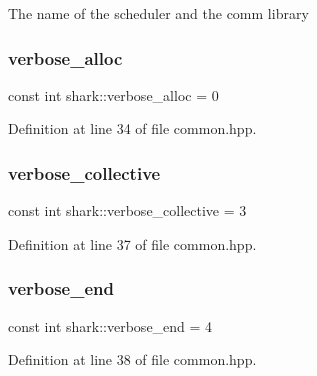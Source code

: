 The name of the scheduler and the comm library \hypertarget{namespaceshark_a067e8941bdd5f38f5ab2e49920787b9d}{}\label{namespaceshark_a067e8941bdd5f38f5ab2e49920787b9d} 
\subsubsection{\texorpdfstring{verbose\+\_\+alloc}{verbose\_alloc}}
{\footnotesize\ttfamily const int shark\+::verbose\+\_\+alloc = 0\hspace{0.3cm}{\ttfamily [static]}}



Definition at line 34 of file common.\+hpp.

\hypertarget{namespaceshark_a8a29362250362c792179fc4096ae03a6}{}\label{namespaceshark_a8a29362250362c792179fc4096ae03a6} 
\subsubsection{\texorpdfstring{verbose\+\_\+collective}{verbose\_collective}}
{\footnotesize\ttfamily const int shark\+::verbose\+\_\+collective = 3\hspace{0.3cm}{\ttfamily [static]}}



Definition at line 37 of file common.\+hpp.

\hypertarget{namespaceshark_a0603d8d658beed6e7e3fc44471f5c04f}{}\label{namespaceshark_a0603d8d658beed6e7e3fc44471f5c04f} 
\subsubsection{\texorpdfstring{verbose\+\_\+end}{verbose\_end}}
{\footnotesize\ttfamily const int shark\+::verbose\+\_\+end = 4\hspace{0.3cm}{\ttfamily [static]}}



Definition at line 38 of file common.\+hpp.

\hypertarget{namespaceshark_a8faafcaa495b6cf0c0eca37a846e45f2}{}\label{namespaceshark_a8faafcaa495b6cf0c0eca37a846e45f2} 
